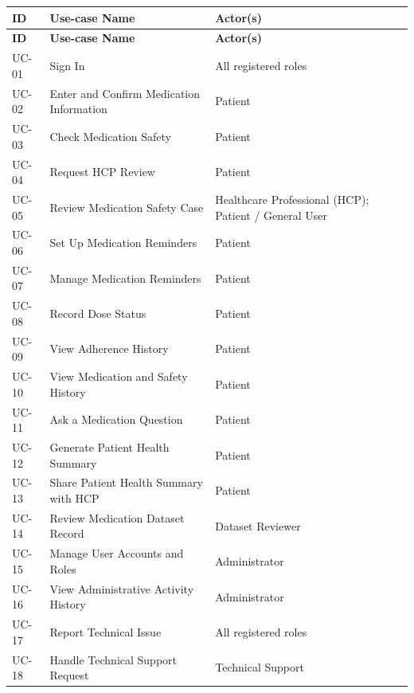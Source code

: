 \begin{longtable}{|
    p{}|
    p{}|
    p{}|
}
\hline

\textbf{ID} &
\textbf{Use-case Name} &
\textbf{Actor(s)}
\\ \hline

\endfirsthead

\hline
\textbf{ID} &
\textbf{Use-case Name} &
\textbf{Actor(s)}
\\ \hline

\endhead

UC-01
& Sign In
& All registered roles
\\ \hline

UC-02
& Enter and Confirm Medication Information
& Patient
\\ \hline

UC-03
& Check Medication Safety
& Patient
\\ \hline

UC-04
& Request HCP Review
& Patient
\\ \hline

UC-05
& Review Medication Safety Case
& Healthcare Professional (HCP); Patient / General User
\\ \hline

UC-06
& Set Up Medication Reminders
& Patient
\\ \hline

UC-07
& Manage Medication Reminders
& Patient
\\ \hline

UC-08
& Record Dose Status
& Patient
\\ \hline

UC-09
& View Adherence History
& Patient
\\ \hline

UC-10
& View Medication and Safety History
& Patient
\\ \hline

UC-11
& Ask a Medication Question
& Patient
\\ \hline

UC-12
& Generate Patient Health Summary
& Patient
\\ \hline

UC-13
& Share Patient Health Summary with HCP
& Patient
\\ \hline

UC-14
& Review Medication Dataset Record
& Dataset Reviewer
\\ \hline

UC-15
& Manage User Accounts and Roles
& Administrator
\\ \hline

UC-16
& View Administrative Activity History
& Administrator
\\ \hline

UC-17
& Report Technical Issue
& All registered roles
\\ \hline

UC-18
& Handle Technical Support Request
& Technical Support
\\ \hline

\end{longtable}



